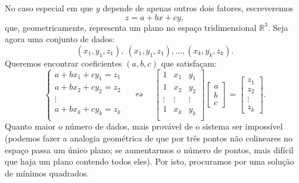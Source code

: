 No caso especial em que $y$ depende de apenas outros dois fatores, escreveremos
\begin{equation}
z = a + b x + c y,
\end{equation} que, geometricamente, representa um plano no espaço tridimensional $\mathbb{R}^3$. Seja agora uma conjunto de dados:
\begin{equation}
(x_1, y_1, z_1), \ (x_1, y_1, z_1), \dots, (x_k, y_k, z_k).
\end{equation} Queremos encontrar coeficientes $(a,b,c)$ que satisfaçam:
\begin{equation}
\left\{
  \begin{array}{c}
    a + b x_1 + c y_1 = z_1 \\
    a + b x_2 + c y_2 = z_2 \\
    \vdots \\
    a + b x_k + c y_k = z_k \\
  \end{array}
\right. \quad \leftrightsquigarrow \quad
\begin{bmatrix}
  1 & x_1 & y_1 \\
  1 & x_2 & y_2 \\
  \vdots & \vdots & \vdots \\
  1 & x_k & y_k \\
\end{bmatrix}
\begin{bmatrix}
  a \\ b \\ c
\end{bmatrix} =
\begin{bmatrix}
  z_1 \\ z_2 \\ \vdots \\ z_k
\end{bmatrix}.
\end{equation} Quanto maior o número de dados, mais provável de o sistema ser impossível (podemos fazer a analogia geométrica de que por três pontos não colineares no espaço passa um único plano; se aumentarmos o número de pontos, mais difícil que haja um plano contendo todos eles). Por isto, procuramos por uma solução de mínimos quadrados.




